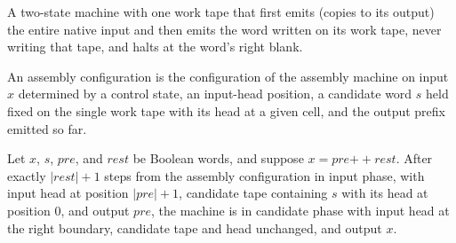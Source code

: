\begin{definition}
\label{Complexity.enumCont_concatTM}
\leanok
{}
A two-state machine with one work tape that first emits (copies to its output)
the entire native input and then emits the word written on its work tape, never
writing that tape, and halts at the word's right blank.
\end{definition}

\begin{definition}
\label{Complexity.enumCont_concatCfg}
\leanok
{}
An assembly configuration is the configuration of the assembly machine on input
$x$ determined by a control state, an input-head position, a candidate word $s$
held fixed on the single work tape with its head at a given cell, and the output
prefix emitted so far.
\end{definition}

\begin{lemma}
\label{Complexity.enumCont_concat_native}
\leanok
{}
Let $x$, $s$, $\mathit{pre}$, and $\mathit{rest}$ be Boolean words, and suppose
$x=\mathit{pre}\mathbin{+\!\!+}\mathit{rest}$. After exactly $|\mathit{rest}|+1$ steps
from the assembly configuration in input phase, with input head at position
$|\mathit{pre}|+1$, candidate tape containing $s$ with its head at position $0$, and
output $\mathit{pre}$, the machine is in candidate phase with input head at the right
boundary, candidate tape and head unchanged, and output $x$.
\end{lemma}

